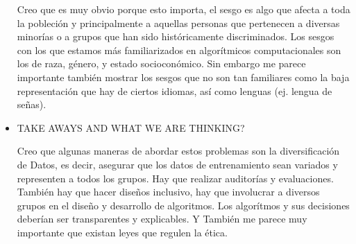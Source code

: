 \documentclass[letter, 11pt, twoside]{report}
\begin{document}
\begin{itemize}
    Creo que es muy obvio porque esto importa, el sesgo es algo que afecta a toda la pobleción y principalmente a aquellas personas que pertenecen a diversas minorías o a grupos que han sido históricamente discriminados. Los sesgos con los que estamos más familiarizados en algorítmicos computacionales son los de raza, género, y estado socioconómico. Sin embargo me parece importante también mostrar los sesgos que no son tan familiares como la baja representación que hay de ciertos idiomas, así como lenguas (ej. lengua de señas).
    \item TAKE AWAYS AND WHAT WE ARE THINKING?
    
    Creo que algunas maneras de abordar estos problemas son la diversificación de Datos, es decir, asegurar que los datos de entrenamiento sean variados y representen a todos los grupos. Hay que realizar auditorías y evaluaciones. También hay que hacer diseños inclusivo, hay que involucrar a diversos grupos en el diseño y desarrollo de algoritmos. Los algorítmos  y sus decisiones deberían ser transparentes y explicables. Y También me parece muy importante que existan leyes que regulen la ética.
    

\end{itemize}
\end{document}
